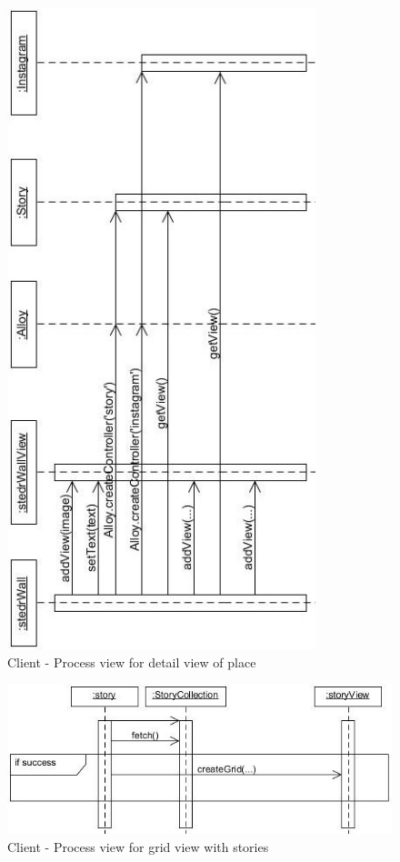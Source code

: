 \documentclass[11pt]{book}
\begin{document}
\begin{figure}[H]
      \centering
      \includegraphics[width=0.8\textwidth]{Figures/Architecture/Sequence/client/stedrWall.jpg}
      \caption{Client - Process view for detail view of place}
      \label{fig:arch_client_process_stedrWall}
\end{figure}

\begin{figure}[H]
      \centering
      \includegraphics[width=1.0\textwidth]{Figures/Architecture/Sequence/client/story.jpg}
      \caption{Client - Process view for grid view with stories}
      \label{fig:arch_client_process_story}
\end{figure}
\end{document}
